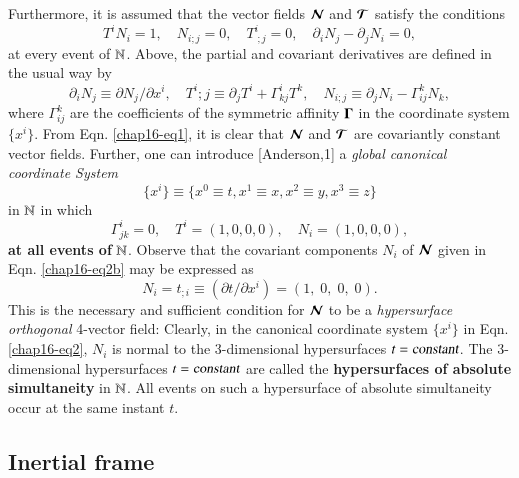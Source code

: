 Furthermore, it is  assumed that the vector fields $\bm{\mathcal{N}}$ and $\bm{\mathcal{T}}$ satisfy the conditions 
\setcounter{equation}{0}
\begin{equation}
T^i N_i =1,\quad  N_{i;j}=0, \quad  T^i_{\;;j}=0, \quad  \partial_i  N_j - \partial_j N_i=0,\label{chap16-eq1} 
\end{equation}
at every event of $\mathbb{N}$. Above,  the partial  and covariant derivatives are defined in the usual way by
\begin{equation*}
\partial_i  N_j\equiv \partial N_j/\partial x^i,\quad T^i;j\equiv\partial_j  T^i+\Gamma^i_{kj} T^k,\quad N_{i;j}\equiv\partial_j  N_i-\Gamma^k_{ij} N_k,
\end{equation*}
where $\Gamma^k_{ij}$ are the coefficients of the symmetric affinity $\mathbf{\Gamma}$ in the coordinate system $\{x^i\}$. From Eqn. \eqref{chap16-eq1}, it is clear that $\bm{\mathcal{N}}$ and $\bm{\mathcal{T}}$ are covariantly constant vector fields. Further, one can introduce [Anderson,1] a \textsl{global canonical coordinate System} 
\begin{equation}
\{x^i\}\equiv \{x^0\equiv t, x^1\equiv x,x^2\equiv y,x^3\equiv z\} \label{chap16-eq2}
\end{equation}
in  $\mathbb{N}$  in which 
\begin{equation*}
\Gamma^i_{jk}=0, \quad T^i=(1,0,0,0),\quad N_i=(1,0,0,0),\tag{2b}\label{chap16-eq2b}
\end{equation*}
\textbf{at all events of} $\mathbb{N}$. Observe that the covariant components $N_i$ of $\bm{\mathcal{N}}$ given in Eqn. \eqref{chap16-eq2b} may be expressed as  
\begin{equation*}
N_i=t_{;i} \equiv (\partial t/\partial x^i)=(1,\;0,\;0,\;0).\tag{2c}\label{chap16-eq2c}
\end{equation*}
This is the necessary and sufficient condition for $\bm{\mathcal{N}}$ to be  a \textsl{hypersurface orthogonal} 4-vector field: Clearly, in the canonical coordinate system $\{x^i\}$  in Eqn. \eqref{chap16-eq2}, $N_i$ is normal to the 3-dimensional hypersurfaces $t=\textsl{constant}$. The 3-dimensional hypersurfaces  $t=\textsl{constant}$  are called the \textbf{hypersurfaces of absolute simultaneity} in $\mathbb{N}$. All events on such a hypersurface of absolute simultaneity occur at the same instant $t$. 

\subsection{Inertial frame}\label{chap16-sec2.1}

